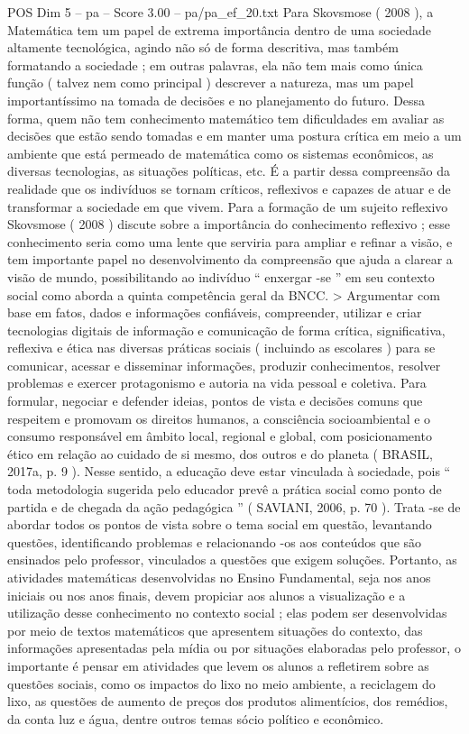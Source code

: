 \begin{textsample}{POS Dim 5 – pa – Score 3.00 – pa/pa\_ef\_20.txt}
Para Skovsmose ( 2008 ), a Matemática tem um papel de extrema importância dentro de uma sociedade altamente tecnológica, agindo não só de forma descritiva, mas também formatando a sociedade ; em outras palavras, ela não tem mais como única função ( talvez nem como principal ) descrever a natureza, mas um papel importantíssimo na tomada de decisões e no planejamento do futuro.
Dessa forma, quem não tem conhecimento matemático tem dificuldades em avaliar as decisões que estão sendo tomadas e em manter uma postura crítica em meio a um ambiente que está permeado de matemática como os sistemas econômicos, as diversas tecnologias, as situações políticas, etc.
É a partir dessa compreensão da realidade que os indivíduos se tornam críticos, reflexivos e capazes de atuar e de transformar a sociedade em que vivem.
Para a formação de um sujeito reflexivo Skovsmose ( 2008 ) discute sobre a importância do conhecimento reflexivo ; esse conhecimento seria como uma lente que serviria para ampliar e refinar a visão, e tem importante papel no desenvolvimento da compreensão que ajuda a clarear a visão de mundo, possibilitando ao indivíduo “ enxergar -se ” em seu contexto social como aborda a quinta competência geral da BNCC. > Argumentar com base em fatos, dados e informações confiáveis, compreender, utilizar e criar tecnologias digitais de informação e comunicação de forma crítica, significativa, reflexiva e ética nas diversas práticas sociais ( incluindo as escolares ) para se comunicar, acessar e disseminar informações, produzir conhecimentos, resolver problemas e exercer protagonismo e autoria na vida pessoal e coletiva.
Para formular, negociar e defender ideias, pontos de vista e decisões comuns que respeitem e promovam os direitos humanos, a consciência socioambiental e o consumo responsável em âmbito local, regional e global, com posicionamento ético em relação ao cuidado de si mesmo, dos outros e do planeta ( BRASIL, 2017a, p. 9 ).
Nesse sentido, a educação deve estar vinculada à sociedade, pois “ toda metodologia sugerida pelo educador prevê a prática social como ponto de partida e de chegada da ação pedagógica ” ( SAVIANI, 2006, p. 70 ).
Trata -se de abordar todos os pontos de vista sobre o tema social em questão, levantando questões, identificando problemas e relacionando -os aos conteúdos que são ensinados pelo professor, vinculados a questões que exigem soluções.
Portanto, as atividades matemáticas desenvolvidas no Ensino Fundamental, seja nos anos iniciais ou nos anos finais, devem propiciar aos alunos a visualização e a utilização desse conhecimento no contexto social ; elas podem ser desenvolvidas por meio de textos matemáticos que apresentem situações do contexto, das informações apresentadas pela mídia ou por situações elaboradas pelo professor, o importante é pensar em atividades que levem os alunos a refletirem sobre as questões sociais, como os impactos do lixo no meio ambiente, a reciclagem do lixo, as questões de aumento de preços dos produtos alimentícios, dos remédios, da conta luz e água, dentre outros temas sócio político e econômico.

\end{textsample}
